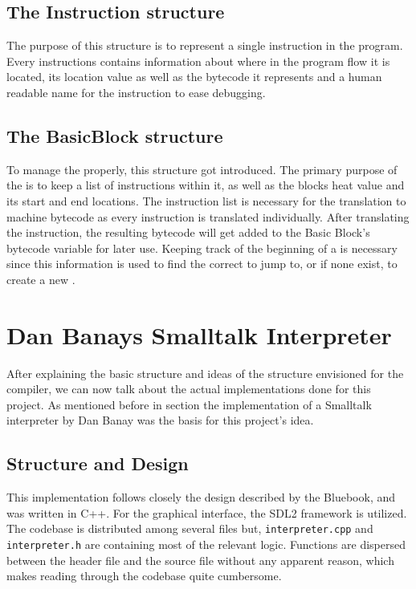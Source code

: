 \subsection{The Instruction structure}
The purpose of this structure is to represent a single instruction in the program. Every instructions contains information about where in the program flow it is located, its location value as well as the bytecode it represents and a human readable name for the instruction to ease debugging.

\subsection{The BasicBlock structure}
To manage the \bbs{} properly, this structure got introduced.
The primary purpose of the \bb{} is to keep a list of instructions within it, as well as the blocks heat value and its start and end locations. 
The instruction list is necessary for the translation to machine bytecode as every instruction is translated individually. After translating the instruction, the resulting bytecode will get added to the Basic Block's bytecode variable for later use. 
Keeping track of the beginning of a \bb{} is necessary since this information is used to find the correct \bb{} to jump to, or if none exist, to create a new \bb{}.

\section{Dan Banays Smalltalk Interpreter}
After explaining the basic structure and ideas of the structure envisioned for the \jit{} compiler, we can now talk about the actual implementations done for this project. As mentioned before in section  the implementation of a Smalltalk interpreter by Dan Banay \cite{dbanayST} was the basis for this project's idea.
\subsection{Structure and Design}
This implementation follows closely the design described by the Bluebook, and was written in C++. For the graphical interface, the SDL2 framework is utilized. 
The codebase is distributed among several files but, \texttt{interpreter.cpp} and \texttt{interpreter.h} are containing most of the relevant logic. Functions are dispersed between the header file and the source file without any apparent reason, which makes reading through the codebase quite cumbersome. 

